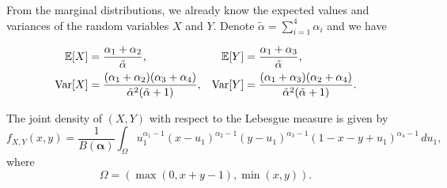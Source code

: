 From the marginal distributions, we already know the expected values and variances of the random variables $X$ and $Y$. Denote $\tilde{\alpha} = \sum_{i=1}^4 \alpha_i$ and we have 

\begin{gather}
    \begin{aligned}
    \mathbb{E}[X] &= \frac{\alpha_1 + \alpha_2}{\tilde{\alpha}},
    & \mathbb{E}[Y] &= \frac{\alpha_1 + \alpha_3}{\tilde{\alpha}},
    \\
    \operatorname{Var}[X] &= \frac{(\alpha_1 + \alpha_2)(\alpha_3 + \alpha_4)}{\tilde{\alpha}^2(\tilde{\alpha} + 1)},
    & \operatorname{Var}[Y] &= \frac{(\alpha_1 + \alpha_3)(\alpha_2 + \alpha_4)}{\tilde{\alpha}^2(\tilde{\alpha} + 1)}.
    \end{aligned}
\end{gather}

\begin{proposition}
  \label{prop:bivariate-beta-density}
  The joint density of $(X,Y)$ with respect to the Lebesgue measure is
  given by 
  \begin{equation}
    f_{X,Y}(x,y) = \frac{1}{B(\boldsymbol{\alpha})}\int_{\Omega} u_1^{\alpha_1 - 1}(x - u_1)^{\alpha_2 -1}(y-u_1)^{\alpha_3-1}(1-x-y+u_1)^{\alpha_4-1} \, du_1,
  \end{equation}
  where 
  $$
  \Omega = (\max(0, x+y-1), \min(x,y)).
  $$
\end{proposition}


